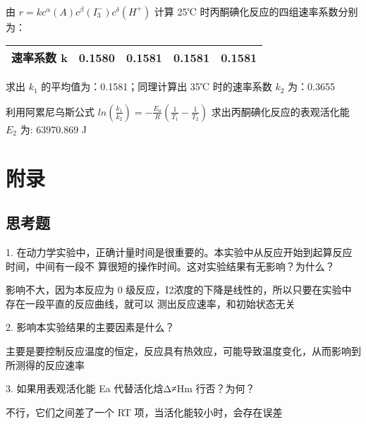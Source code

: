 \documentclass[4pt,a4papper]{article}
\begin{document}
~\\

由 $r = kc^\alpha(A)c^\beta(I_3^-)c^\delta(H^+)$ 计算 25℃ 时丙酮碘化反应的四组速率系数分别为：

\begin{table}[htbp]
\centering
\begin{tabular}{|l|l|l|l|l|}
\hline
速率系数 k & 0.1580 & 0.1581 & 0.1581 & 0.1581 \\ \hline
\end{tabular}
\end{table}

求出 $k_1$ 的平均值为：0.1581；同理计算出 35℃ 时的速率系数 $k_2$ 为：0.3655

利用阿累尼乌斯公式 $ln(\frac{k_1}{k_2}) = -\frac{E_a}{R}(\frac{1}{T_1} - \frac{1}{T_2})$ 求出丙酮碘化反应的表观活化能 $E_2$ 为: 63970.869 J
\newpage


\section{附录}
\subsection{思考题}
1. 在动力学实验中，正确计量时间是很重要的。本实验中从反应开始到起算反应时间，中间有一段不 算很短的操作时间。这对实验结果有无影响？为什么？

	影响不大，因为本反应为 0 级反应，I2浓度的下降是线性的，所以只要在实验中存在一段平直的反应曲线，就可以 测出反应速率，和初始状态无关

2. 影响本实验结果的主要因素是什么？ 

	主要是要控制反应温度的恒定，反应具有热效应，可能导致温度变化，从而影响到所测得的反应速率

3. 如果用表观活化能 Ea 代替活化焓Δ≠Hm 行否？为何？ 

	不行，它们之间差了一个 RT 项，当活化能较小时，会存在误差



\clearpage
\end{document}
